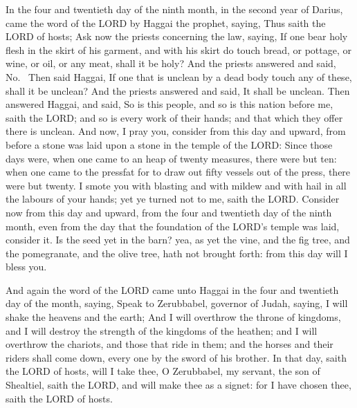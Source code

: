  In the four and twentieth day of the ninth month, in the
second year of Darius, came the word of the LORD by Haggai the prophet,
saying,  Thus saith the LORD of hosts; Ask now the
priests concerning the law, saying,  If one bear holy
flesh in the skirt of his garment, and with his skirt do touch bread, or
pottage, or wine, or oil, or any meat, shall it be holy? And the priests
answered and said, No.~ Then said Haggai, If one that is
unclean by a dead body touch any of these, shall it be unclean? And the
priests answered and said, It shall be unclean.  Then
answered Haggai, and said, So is this people, and so is this nation
before me, saith the LORD; and so is every work of their hands; and that
which they offer there is unclean.  And now, I pray you,
consider from this day and upward, from before a stone was laid upon a
stone in the temple of the LORD:  Since those days were,
when one came to an heap of twenty measures, there were but ten: when
one came to the pressfat for to draw out fifty vessels out of the press,
there were but twenty.  I smote you with blasting and
with mildew and with hail in all the labours of your hands; yet ye
turned not to me, saith the LORD.  Consider now from this
day and upward, from the four and twentieth day of the ninth month, even
from the day that the foundation of the LORD's temple was laid, consider
it.  Is the seed yet in the barn? yea, as yet the vine,
and the fig tree, and the pomegranate, and the olive tree, hath not
brought forth: from this day will I bless you.

 And again the word of the LORD came unto Haggai in the
four and twentieth day of the month, saying,  Speak to
Zerubbabel, governor of Judah, saying, I will shake the heavens and the
earth;  And I will overthrow the throne of kingdoms, and
I will destroy the strength of the kingdoms of the heathen; and I will
overthrow the chariots, and those that ride in them; and the horses and
their riders shall come down, every one by the sword of his brother.
 In that day, saith the LORD of hosts, will I take thee,
O Zerubbabel, my servant, the son of Shealtiel, saith the LORD, and will
make thee as a signet: for I have chosen thee, saith the LORD of hosts.

